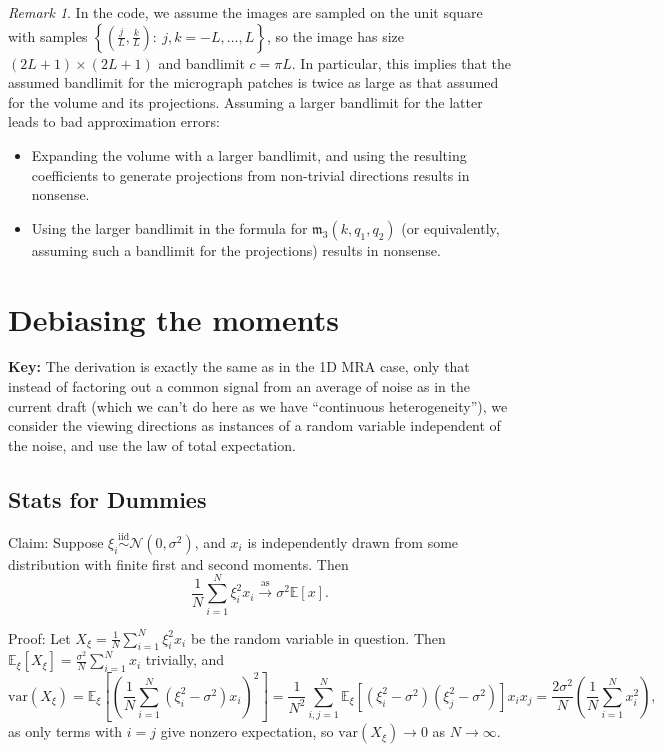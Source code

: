 \documentclass{amsart}
\theoremstyle{definition}
\theoremstyle{remark}
\newtheorem{remark}[theorem]{Remark}
\numberwithin{equation}{section}
\begin{document}
\begin{remark}
In the code, we assume the images are sampled on the unit square with samples $\left\{\left(\frac{j}{L},\frac{k}{L}\right):\ j,k = -L,\ldots, L\right\}$, so the image has size $(2L+1)\times(2L+1)$ and bandlimit $c=\pi L$. In particular, this implies that the assumed bandlimit for the micrograph patches is twice as large as that assumed for the volume and its projections. Assuming a larger bandlimit for the latter leads to bad approximation errors: \begin{itemize}
    \item Expanding the volume with a larger bandlimit, and using the resulting coefficients to generate projections from non-trivial directions results in nonsense.
    \item Using the larger bandlimit in the formula for $\mathfrak{m}_3(k,q_1,q_2)$ (or equivalently, assuming such a bandlimit for the projections) results in nonsense.
\end{itemize}
\end{remark}

\section{Debiasing the moments}
\textbf{Key:} The derivation is exactly the same as in the 1D MRA
case, only that instead of factoring out a common signal from an
average of noise as in the current draft (which we can't do here as we have
``continuous heterogeneity''), we consider the viewing directions as instances of a random
variable independent of the noise, and use the law of total expectation.

\subsection{Stats for Dummies}

Claim: Suppose
$\xi_i\overset{\text{iid}}{\sim}\mathcal{N}(0,\sigma^2)$, and $x_i$ is
independently drawn from some distribution with finite first and
second moments. Then 
\[\frac{1}{N}\sum_{i=1}^N\xi_i^2x_i\overset{\text{as}}{\to} \sigma^2\mathbb{E}[x].\] 

Proof: Let $X_{\xi} = \frac{1}{N}\sum_{i=1}^N\xi_i^2x_i$ be the random variable in question. Then $\mathbb{E}_{\xi}[X_{\xi}]=\frac{\sigma^2}{N}\sum_{i=1}^Nx_i$ trivially, and 
\[ \text{var}(X_{\xi}) = \mathbb{E}_{\xi}\left[\left(\frac{1}{N}\sum_{i=1}^N(\xi_i^2-\sigma^2)x_i\right)^2\right] = \frac{1}{N^2}\sum_{i,j=1}^N\mathbb{E}_{\xi}[(\xi_i^2-\sigma^2)(\xi_j^2-\sigma^2)]x_ix_j = \frac{2\sigma^2}{N}\left(\frac{1}{N}\sum_{i=1}^Nx_i^2\right),\]
as only terms with $i=j$ give nonzero expectation, so $\text{var}(X_{\xi})\to0$ as $N\to\infty$.
\end{document}
